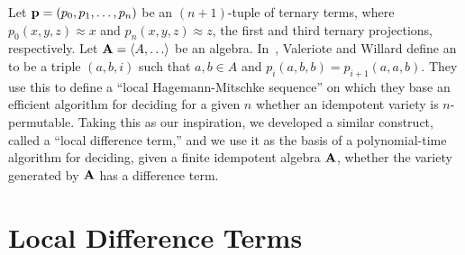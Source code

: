 Let $\mathbf{p} = (p_0, p_1, \dots, p_n)$ be an $(n+1)$-tuple of ternary terms, where
$p_0(x,y,z) \approx x$ and $p_n(x,y,z) \approx z$, the first and third
ternary projections, respectively. 
Let $\bA=\< A, \dots\>$ be an algebra.
In~\cite{MR3239624},
Valeriote and Willard define an 
to be a triple $(a,b,i)$ such that $a, b \in A$ and
$p_i(a,b,b) = p_{i+1}(a,a,b)$. They use this to define 
a ``local Hagemann-Mitschke sequence'' on which they base an efficient algorithm
for deciding for a given $n$ whether an idempotent variety is $n$-permutable.
Taking this as our inspiration, we developed a similar construct, called
a ``local difference term,'' and we use it as the basis of a polynomial-time
algorithm for deciding, given a finite idempotent algebra $\mathbf{A}$, whether the variety
generated by $\mathbf{A}$ has a difference term.



\section{Local Difference Terms}




%
%



